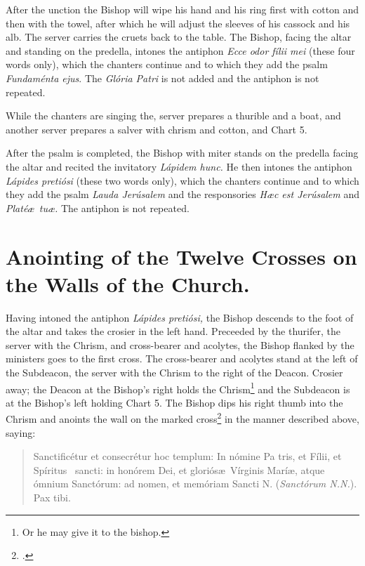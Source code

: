 \documentclass[letterpaper]{report}
\begin{document}
{    \rubric After the unction the Bishop will wipe his hand and his ring first
    with cotton and then with the towel, after which he will adjust the sleeves
    of his cassock and his alb. The server carries the cruets back to the
    table. The Bishop, facing the altar and standing on the predella, intones
    the antiphon \textit{Ecce odor f\'ilii mei} (these four words only), which
    the chanters continue and to which they add the psalm \textit{Fundam\'enta
    ejus}. The \textit{Glória Patri} is not added and the antiphon is not
    repeated.

    While the chanters are singing the, server prepares a thurible and a boat,
    and another server prepares a salver with chrism and cotton, and Chart 5.

    \rubric After the psalm is completed, the Bishop with miter stands on the
    predella facing the altar and recited the invitatory \textit{Lápidem hunc.}
    He then intones the antiphon \textit{Lápides pretiósi} (these two words
    only), which the chanters continue and to which they add the psalm
    \textit{Lauda Jerúsalem} and the responsories \textit{H\ae c est Jerúsalem}
    and \textit{Platé\ae\ tu\ae.} The antiphon is not repeated.

    \section{Anointing of the Twelve Crosses on the Walls of the Church.}

    \rubric Having intoned the antiphon \textit{Lápides pretiósi,} the Bishop
    descends to the foot of the altar and takes the crosier in the left hand.
    Preceeded by the thurifer, the server with the Chrism, and cross-bearer and
    acolytes, the Bishop flanked by the ministers goes to the first cross. The
    cross-bearer and acolytes stand at the left of the Subdeacon, the server
    with the Chrism to the right of the Deacon. Crosier away; the Deacon at the
    Bishop's right holds the Chrism\footnote{Or he may give it to the bishop.}
    and the Subdeacon is at the Bishop's left holding Chart 5. The Bishop dips
    his right thumb into the Chrism and anoints the wall on the marked
    cross\footcite[\textit{Above} or \textit{below} the cross, if it be of
    marble or metal. See][note 2, p. 112.]{consecranda} in the manner described
    above, saying:

    \begin{quote}
        Sancti\cross ficétur et conse\cross crétur hoc templum: In nómine Pa\cross
        tris, et Fí\cross lii, et Spíritus \cross\ sancti: in honórem Dei, et
        gloriós\ae\ Vírginis Marí\ae, atque ómnium Sanctórum: ad nomen, et memóriam
        Sancti N. (\textit{Sanctórum N.N.}). Pax tibi.
    \end{quote}

}
\end{document}
